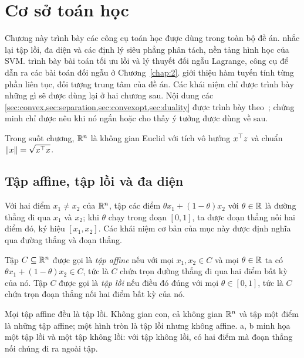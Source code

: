 \chapter{Cơ sở toán học}\label{chap:1}

Chương này trình bày các công cụ toán học được dùng trong toàn bộ đề án.  nhắc lại tập lồi, đa diện và các định lý siêu phẳng phân tách, nền tảng hình học của SVM.  trình bày bài toán tối ưu lồi và lý thuyết đối ngẫu Lagrange, công cụ để dẫn ra các bài toán đối ngẫu ở Chương~\ref{chap:2}.  giới thiệu hàm tuyến tính từng phần liên tục, đối tượng trung tâm của đề án. Các khái niệm chỉ được trình bày những gì sẽ được dùng lại ở hai chương sau. Nội dung các \cref{sec:convex,sec:separation,sec:convexopt,sec:duality} được trình bày theo~\cite{boyd2004,dovanluu2000}; chứng minh chỉ được nêu khi nó ngắn hoặc cho thấy ý tưởng được dùng về sau.

Trong suốt chương, $\mathbb{R}^n$ là không gian Euclid với tích vô hướng $x^\top z$ và chuẩn $\|x\|=\sqrt{x^\top x}$.

\section{Tập affine, tập lồi và đa diện}\label{sec:convex}

Với hai điểm $x_1\neq x_2$ của $\mathbb{R}^n$, tập các điểm $\theta x_1+(1-\theta)x_2$ với $\theta\in\mathbb{R}$ là đường thẳng đi qua $x_1$ và $x_2$; khi $\theta$ chạy trong đoạn $[0,1]$, ta được đoạn thẳng nối hai điểm đó, ký hiệu $[x_1,x_2]$. Các khái niệm cơ bản của mục này được định nghĩa qua đường thẳng và đoạn thẳng.

\begin{definition}\label{def:affine-convex}
Tập $C\subseteq\mathbb{R}^n$ được gọi là \emph{tập affine} nếu với mọi $x_1,x_2\in C$ và mọi $\theta\in\mathbb{R}$ ta có $\theta x_1+(1-\theta)x_2\in C$, tức là $C$ chứa trọn đường thẳng đi qua hai điểm bất kỳ của nó. Tập $C$ được gọi là \emph{tập lồi} nếu điều đó đúng với mọi $\theta\in[0,1]$, tức là $C$ chứa trọn đoạn thẳng nối hai điểm bất kỳ của nó.
\end{definition}

Mọi tập affine đều là tập lồi. Không gian con, cả không gian $\mathbb{R}^n$ và tập một điểm là những tập affine; một hình tròn là tập lồi nhưng không affine. a, b minh họa một tập lồi và một tập không lồi: với tập không lồi, có hai điểm mà đoạn thẳng nối chúng đi ra ngoài tập.


